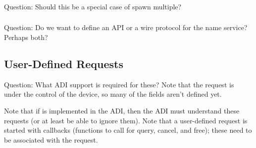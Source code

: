 \documentclass{article}
\begin{document}
\subsubsection{}

\subsubsection{}
Question:  Should this be a special case of spawn multiple?

\subsubsection{}

\subsubsection{}
Question:  Do we want to define an API or a wire protocol for the name
service?  Perhaps both?

\subsubsection{}

\subsubsection{}

\subsubsection{}

\subsubsection{}

\subsection{User-Defined Requests}
\label{sec:grequest}

Question:  What ADI support is required for these?  Note that the
request is under the control of the device, so many of the fields
aren't defined yet.

Note that if  is implemented in the ADI, then the
ADI must understand these requests (or at least be able to ignore
them).
Note that a user-defined request is started with callbacks (functions
to call for query, cancel, and free); these need to be associated with
the request.  
\end{document}

